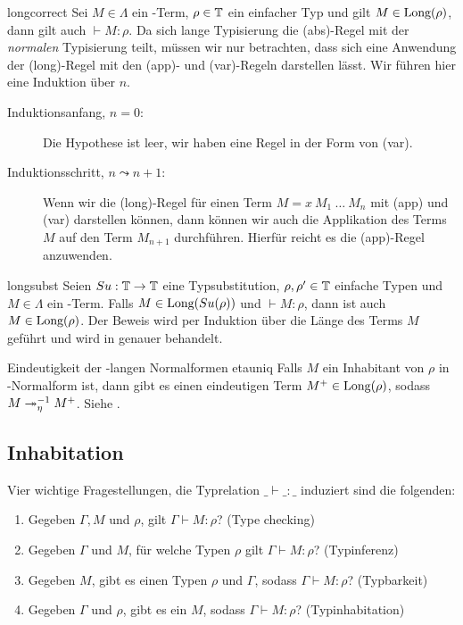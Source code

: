 \begin{lemma}{}{longcorrect}
    Sei $M\in\Lambda$ ein \tlambda-Term, $\rho\in\mathbb{T}$ ein einfacher Typ und gilt $M\in\text{Long}(\rho)$, dann gilt auch $\vdash M : \rho$.
    \Proofidea
    Da sich lange Typisierung die (abs)-Regel mit der \emph{normalen} Typisierung teilt, müssen wir nur betrachten, dass sich eine Anwendung der (long)-Regel mit den (app)- und (var)-Regeln darstellen lässt.
    Wir führen hier eine Induktion über $n$.
    \begin{description}
        \item[Induktionsanfang, $n = 0$:] Die Hypothese ist leer, wir haben eine Regel in der Form von (var).
        \item[Induktionsschritt, $n\leadsto n+1$:] Wenn wir die (long)-Regel für einen Term $M=x~M_1~\ldots~M_n$ mit (app) und (var) darstellen können, dann können wir auch die Applikation des Terms $M$ auf den Term $M_{n+1}$ durchführen. Hierfür reicht es die (app)-Regel anzuwenden.
        \end{description}
\end{lemma}

\begin{lemma}{}{longsubst}
Seien $Su:\mathbb{T}\to\mathbb{T}$ eine Typsubstitution, $\rho, \rho'\in \mathbb{T}$ einfache Typen und $M\in\Lambda$ ein \tlambda-Term. Falls $M\in\text{Long}(Su(\rho))$ und $\vdash M:\rho$, dann ist auch $M\in\text{Long}(\rho)$.
\Proof
Der Beweis wird per Induktion über die Länge des Terms $M$ geführt und wird in  genauer behandelt.
\end{lemma}


\begin{lemma}{Eindeutigkeit der \teta-langen Normalformen \cite[8A8]{Hindley2008}}{etauniq}
    Falls $M$ ein Inhabitant von $\rho$ in \tbeta-Normalform ist, dann gibt es einen eindeutigen Term $M^+\in\text{Long}(\rho)$, sodass
    $M\twoheadrightarrow_\eta^{-1} M^+$.
    \Proof
    Siehe \cite[8A8]{Hindley2008}.
\end{lemma}


\subsection{Inhabitation}
\label{sec:inhab}
Vier wichtige Fragestellungen, die Typrelation $\_ \vdash \_ : \_$ induziert sind die folgenden:
\begin{enumerate}
    \item Gegeben $\Gamma, M$ und $\rho$, gilt $\Gamma\vdash M : \rho$? (Type checking)
    \item Gegeben $\Gamma$ und $M$, für welche Typen $\rho$ gilt $\Gamma\vdash M: \rho$? (Typinferenz)
    \item Gegeben $M$, gibt es einen Typen $\rho$ und $\Gamma$, sodass $\Gamma\vdash M : \rho$? (Typbarkeit)
    \item Gegeben $\Gamma$ und $\rho$, gibt es ein $M$, sodass $\Gamma\vdash M : \rho$? (Typinhabitation)
\end{enumerate}

